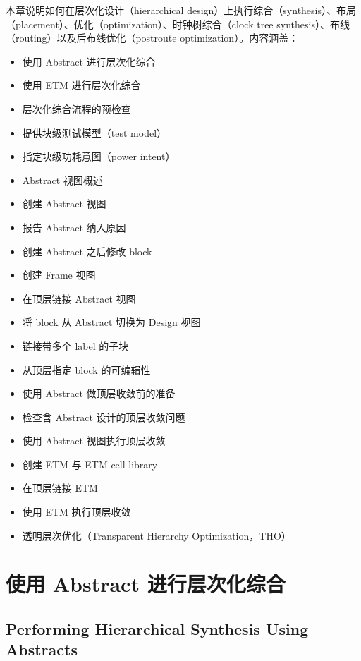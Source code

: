 \label{chap:hier}

本章说明如何在层次化设计（hierarchical design）上执行综合（synthesis）、布局（placement）、优化（optimization）、时钟树综合（clock tree synthesis）、布线（routing）以及后布线优化（postroute optimization）。内容涵盖：
\begin{itemize}
  \item 使用 Abstract 进行层次化综合
  \item 使用 ETM 进行层次化综合
  \item 层次化综合流程的预检查
  \item 提供块级测试模型（test model）
  \item 指定块级功耗意图（power intent）
  \item Abstract 视图概述
  \item 创建 Abstract 视图
  \item 报告 Abstract 纳入原因
  \item 创建 Abstract 之后修改 block
  \item 创建 Frame 视图
  \item 在顶层链接 Abstract 视图
  \item 将 block 从 Abstract 切换为 Design 视图
  \item 链接带多个 label 的子块
  \item 从顶层指定 block 的可编辑性
  \item 使用 Abstract 做顶层收敛前的准备
  \item 检查含 Abstract 设计的顶层收敛问题
  \item 使用 Abstract 视图执行顶层收敛
  \item 创建 ETM 与 ETM cell library
  \item 在顶层链接 ETM
  \item 使用 ETM 执行顶层收敛
  \item 透明层次优化（Transparent Hierarchy Optimization，THO）
\end{itemize}

\section{使用 Abstract 进行层次化综合}
\subsection*{Performing Hierarchical Synthesis Using Abstracts}

